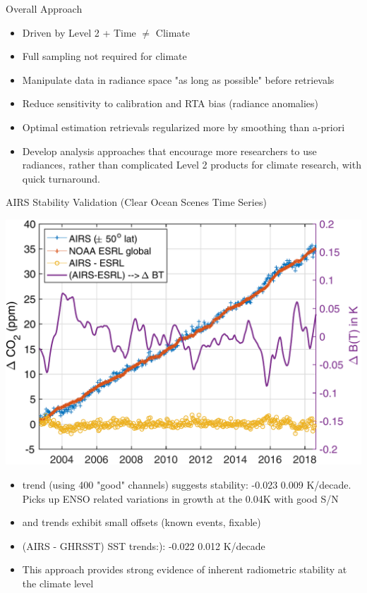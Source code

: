 \documentclass[10pt,t]{beamer}
\begin{document}
\begin{frame}{Overall Approach}
\begin{itemize}
\item Driven by Level 2 + Time \(\neq\) Climate
\item Full sampling not required for climate
\item Manipulate data in radiance space "as long as possible" before retrievals
\item Reduce sensitivity to calibration and RTA bias (radiance anomalies)
\item Optimal estimation retrievals regularized more by smoothing than a-priori
\item Develop analysis approaches that encourage more researchers to use radiances, rather than complicated Level 2 products for climate research, with quick turnaround.
\end{itemize}
\end{frame}
\begin{frame}{AIRS Stability Validation (Clear Ocean Scenes Time Series)}
\vspace{-0.1in}
\begin{center}
\includegraphics[width=0.65\linewidth]{SunClimate2022/fig10.pdf}
\end{center}

\vspace{-0.05in}
\footnotesize
\begin{itemize}
\item \cd trend (using 400 "good" channels) suggests stability:  -0.023 \textpm{} 0.009 K/decade.  Picks up ENSO related variations in \cd growth at the 0.04K with good S/N
\item \methane and \nitrous trends exhibit small offsets (known events, fixable)
\item (AIRS - GHRSST) SST trends:):  -0.022 \textpm{} 0.012 K/decade
\item This approach provides strong evidence of inherent radiometric stability at the climate level
\end{itemize}
\end{frame}
\end{document}
